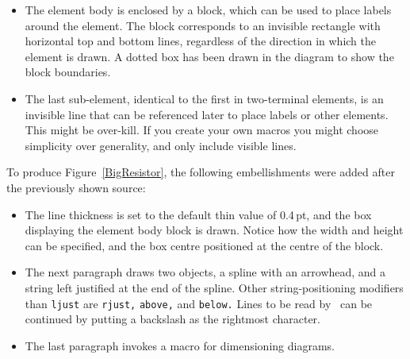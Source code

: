 \begin{itemize}
\item The element body is enclosed by a block, which can be
   used to place labels around the element.  The block
   corresponds to an invisible rectangle with horizontal top and bottom lines,
   regardless of the direction in which the element is drawn.  A
   dotted box has been drawn in the diagram to show the block boundaries.
\item The last sub-element, identical to the first in two-terminal
   elements, is an invisible line that can be referenced later to
   place labels or other elements.  This might be over-kill.  If you create
   your own macros you might choose simplicity over generality, and only
   include visible lines.
  \end{itemize}

To produce Figure~\ref{BigResistor}, the following embellishments
were added after the previously shown source:
{\small  }

\begin{itemize}
\item The line thickness is set to the default thin value of \hbox{0.4\,pt},
   and the box displaying the element body block is drawn.  Notice how the
   width and height can be specified, and the box centre positioned at
   the centre of the block.
\item The next paragraph draws two objects, a spline with an arrowhead,
   and a string left justified at the end of the spline.  Other
   string-positioning modifiers than {\tt ljust} are {\tt rjust,}
   {\tt above,} and {\tt below.} Lines to be read by \pic\ can be
   continued by putting a backslash as the rightmost character. 

\item The last paragraph invokes a macro for dimensioning diagrams.
   \end{itemize}

